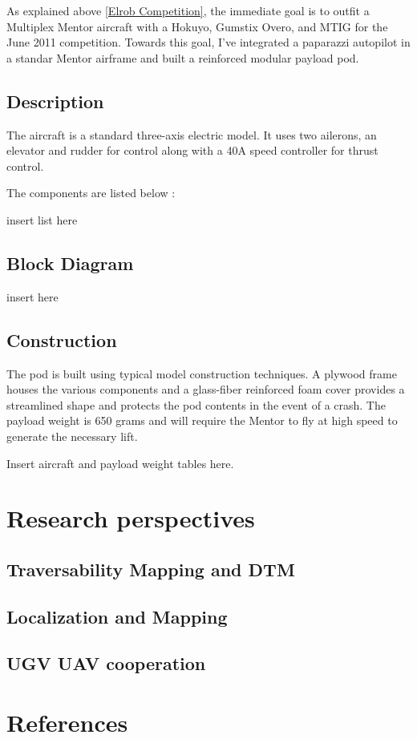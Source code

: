 \documentclass[a4paper,11pt]{report}
\begin{document}
As explained above \ref{Elrob Competition}, the immediate goal is to outfit a Multiplex Mentor aircraft with a Hokuyo, Gumstix Overo, and MTIG for the June 2011 competition. Towards this goal, I've integrated a paparazzi autopilot in a standar Mentor airframe and built a reinforced modular payload pod. 

\subsection{Description}

The aircraft is a standard three-axis electric model. It uses two ailerons, an elevator and rudder for control along with a 40A speed controller for thrust control.

The components are listed below :

insert list here

\subsection{Block Diagram}

insert here

\subsection{Construction}

The pod is built using typical model construction techniques. A plywood frame houses the various components and a glass-fiber reinforced foam cover provides a streamlined shape and protects the pod contents in the event of a crash. The payload weight is 650 grams and will require the Mentor to fly at high speed to generate the necessary lift.

Insert aircraft and payload weight tables here.
 
\section{Research perspectives}


\subsection{Traversability Mapping and DTM}

\subsection{Localization and Mapping}

\subsection{UGV UAV cooperation}

\section{References}
\end{document}
